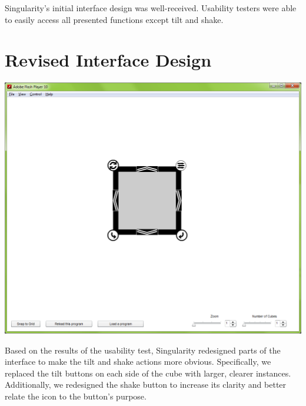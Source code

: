 \documentclass[12pt]{article}
\begin{document}
Singularity's initial interface design was well-received. Usability testers were able to easily access all presented functions except tilt and shake.

\section{Revised Interface Design}
\begin{center}
  \includegraphics[scale=.4]{../prototype/prototype2.png}
\end{center}

Based on the results of the usability test, Singularity redesigned parts of the interface to make the tilt and shake actions more obvious. Specifically, we replaced the tilt buttons on each side of the cube with larger, clearer instances. Additionally, we redesigned the shake button to increase its clarity and better relate the icon to the button's purpose.
\end{document}
